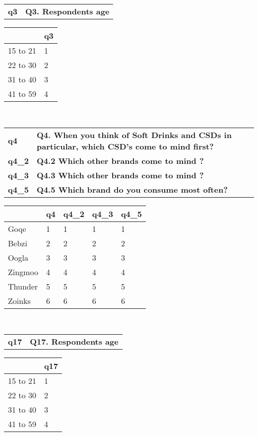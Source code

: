 \documentclass[8pt,twocolumn]{article}
\begin{document}
\noindent
\begin{tabular}{p{1cm}p{6cm}}
\bfseries{q3} & \bfseries{Q3. Respondents age}\\
\end{tabular}
\noindent
\begin{tabular}{|p{1.5cm}|p{.7cm}|}
\hline
 & q3\\
\hline
15 to 21 & 1 \\
22 to 30 & 2 \\
31 to 40 & 3 \\
41 to 59 & 4 \\
\hline
\end{tabular}\\
\noindent
\begin{tabular}{p{1cm}p{6cm}}
\bfseries{q4} & \bfseries{Q4. When you think of Soft Drinks and CSDs in particular, which CSD's come to mind first?}\\
\bfseries{q4\_2} & \bfseries{Q4.2 Which other brands come to mind ?}\\
\bfseries{q4\_3} & \bfseries{Q4.3 Which other brands come to mind ?}\\
\bfseries{q4\_5} & \bfseries{Q4.5 Which brand do you consume most often?}\\
\end{tabular}
\noindent
\begin{tabular}{|p{1.5cm}|p{.7cm}|p{.7cm}|p{.7cm}|p{.7cm}|}
\hline
 & q4 & q4\_2 & q4\_3 & q4\_5\\
\hline
Goqe & 1 & 1 & 1 & 1 \\
Bebzi & 2 & 2 & 2 & 2 \\
Oogla & 3 & 3 & 3 & 3 \\
Zingmoo & 4 & 4 & 4 & 4 \\
Thunder & 5 & 5 & 5 & 5 \\
Zoinks & 6 & 6 & 6 & 6 \\
\hline
\end{tabular}\\
\noindent
\begin{tabular}{p{1cm}p{6cm}}
\bfseries{q17} & \bfseries{Q17. Respondents age}\\
\end{tabular}
\noindent
\begin{tabular}{|p{1.5cm}|p{.7cm}|}
\hline
 & q17\\
\hline
15 to 21 & 1 \\
22 to 30 & 2 \\
31 to 40 & 3 \\
41 to 59 & 4 \\
\hline
\end{tabular}\\
\end{document}

